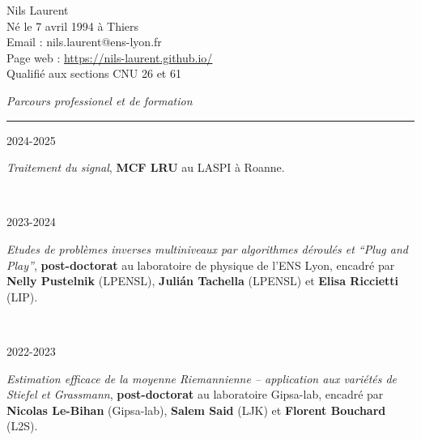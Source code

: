 
{\color{DefaultGray}
	\noindent
	Nils Laurent\\
	Né le 7 avril 1994 à Thiers\\
	Email : nils.laurent@ens-lyon.fr\\
	Page web : \url{https://nils-laurent.github.io/}\\
	Qualifié aux sections CNU 26 et 61\\
	\vspace{5mm}
	
	\noindent
	\textit{\Large \color{MyGray} \hspace{5mm} Parcours professionel et de formation}
	\vspace{2mm}
	{\color{DefaultGray}\hrule height .1pt}
	\vspace{4mm}
	
	\noindent
	\begin{minipage}{0.20\textwidth}
		\color{MyGray} 2024-2025
	\end{minipage}
	\hfill
	\begin{minipage}{0.70\textwidth}
		\emph{Traitement du signal}, \textbf{MCF LRU} au LASPI à Roanne.
	\end{minipage}\\
	\vspace{2mm}
	
	\noindent
	\begin{minipage}{0.20\textwidth}
		\color{MyGray} 2023-2024
	\end{minipage}
	\hfill
	\begin{minipage}{0.70\textwidth}
		\emph{Etudes de problèmes inverses multiniveaux par algorithmes déroulés et ``Plug and Play''}, \textbf{post-doctorat} au laboratoire de physique de l'ENS Lyon, encadré par \textbf{Nelly Pustelnik} (LPENSL), \textbf{Julián Tachella} (LPENSL) et \textbf{Elisa Riccietti} (LIP).
	\end{minipage}\\
	\vspace{2mm}
	
	\noindent
	\begin{minipage}{0.20\textwidth}
		\color{MyGray} 2022-2023
	\end{minipage}
	\hfill
	\begin{minipage}{0.70\textwidth}
		\emph{Estimation efficace de la moyenne Riemannienne -- application aux variétés de Stiefel et Grassmann}, \textbf{post-doctorat} au laboratoire Gipsa-lab, encadré par \textbf{Nicolas Le-Bihan} (Gipsa-lab), \textbf{Salem Said} (LJK) et \textbf{Florent Bouchard} (L2S).
	\end{minipage}\\
	\vspace{2mm}
	
}
